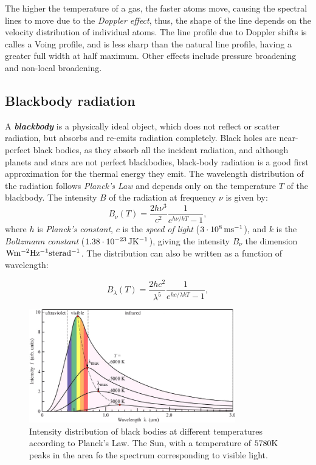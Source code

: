 The higher the temperature of a gas, the faster atoms move, causing the spectral lines to move due to the \textit{Doppler effect}, thus, the shape of the line depends on the velocity distribution of individual atoms. The line profile due to Doppler shifts is calles a Voing profile, and is less sharp than the natural line profile, having a greater full width at half maximum. Other effects include pressure broadening and non-local broadening. 

\subsection{Blackbody radiation}

A \textbf{\textit{blackbody}} is a physically ideal object, which does not reflect or scatter radiation, but absorbs and re-emits radiation completely. Black holes are near-perfect black bodies, as they absorb all the incident radiation, and although planets and stars are not perfect blackbodies, black-body radiation is a good first approximation for the thermal energy they emit. The wavelength distribution of the radiation follows \textit{Planck's Law} and depends only on the temperature $T$ of the blackbody. The intensity $B$ of the radiation at frequency $\nu$ is given by:
\begin{equation}\label{eq:planck}
	B_\nu(T) 
	=\frac{2h\nu^3}{c^2}\frac{1}{e^{h\nu/kT}-1},
\end{equation}	 
where $h$ is \textit{Planck's constant}, $c$ is the \textit{speed of light} ($3 \cdot 10^8 \, \rm{ms^{-1}}$), and $k$ is the \textit{Boltzmann constant} ($1.38 \cdot 10^{-23} \, \rm{JK^{-1}}$), giving the intensity $B_\nu$ the dimension $\rm{W m^{-2} Hz^{-1} sterad^{-1}}$. The distribution can also be written as a function of wavelength: 

\begin{equation}
	B_\lambda(T) 
	=\frac{2hc^2}{\lambda^5}\frac{1}{e^{hc/\lambda kT}-1},
\end{equation}	

\begin{figure}[h]
		\centering
		\includegraphics[width=0.8\textwidth]{img/planck-distribution}
		\caption{Intensity distribution of black bodies at different temperatures according to Planck's Law. The Sun, with a temperature of $5780 \rm{K}$ peaks in the area fo the spectrum corresponding to visible light. \citep{Openstax:Physics}}
		\label{fig:planck-distrib}
\end{figure}
 
